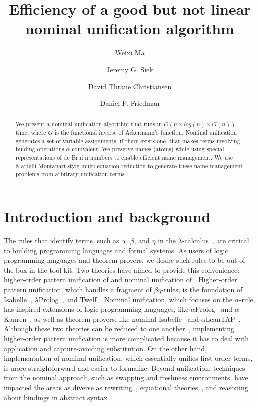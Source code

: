 \documentclass[a4paper,UKenglish]{lipics-v2016}
\title{Efficiency of a good but not linear nominal unification algorithm}
\author[1]{Weixi Ma}
\author[2]{Jeremy G. Siek}
\author[3]{David Thrane Christiansen}
\author[4]{Daniel P. Friedman}
\affil[1]{Indiana University,
  \texttt{mvc@iu.edu}}
\affil[2]{Indiana University,
  \texttt{jsiek@indiana.edu}}
\affil[3]{Galois, Inc.,
  \texttt{dtc@galois.com}}
\affil[4]{Indiana University,
  \texttt{dfried@indiana.edu}}
\begin{document}
\maketitle

\begin{abstract}
  We present a nominal unification algorithm that runs in $O(n \times
  log(n) \times G(n))$ time, where $G$ is the functional inverse of
  Ackermann's function.  Nominal unification generates a set of
  variable assignments, if there exists one, that makes terms
  involving binding operations $\alpha$-equivalent. We preserve names (atoms)
  while using special representations of de Bruijn numbers
  to enable efficient name management.
  We use Martelli-Montanari style multi-equation reduction
  to generate these name management problems from arbitrary unification terms.
\end{abstract}

\section{Introduction and background}

The rules that identify terms, such as $\alpha$, $\beta$, and $\eta$
in the $\lambda$-calculus~\citep{church_calculi_1941}, are critical to
building programming languages and formal systems.  As users of logic
programming languages and theorem provers, we desire such rules to be
out-of-the-box in the tool-kit.  Two theories have aimed to provide
this convenience: higher-order pattern unification of
\citet{miller_logic_1989} and nominal unification of
\citet{urban_nominal_2004}.  Higher-order pattern unification, which
handles a fragment of $\beta\eta$-rules, is the foundation of
Isabelle~\citep{paulson_natural_1986},
$\lambda$Prolog~\citep{nadathur_overview_1988}, and
Twelf~\citep{pfenning_system_1999}.  Nominal unification, which
focuses on the $\alpha$-rule, has inspired extensions of logic
programming languages, like $\alpha$Prolog~\citep{cheney_prolog:_2004}
and $\alpha$Kanren~\citep{byrd_kanren_2007}, as well as theorem
provers, like nominal Isabelle~\citep{urban_nominal_2005} and
$\alpha$LeanTAP~\citep{near_leantap:_2008}.  Although these two
theories can be reduced to one another~\citep{cheney_relating_2005,
  levy_nominal_2012}, implementing higher-order pattern unification is
more complicated because it has to deal with application and
capture-avoiding substitution.  On the other hand, implementation of
nominal unification, which essentially unifies first-order terms, is
more straightforward and easier to formalize.  Beyond unification,
techniques from the nominal approach, such as swapping and freshness
environments, have impacted the areas as diverse as
rewriting~\citep{fernandez_nominal_2004, fernandez_nominal_2005,
  fernandez_nominal_2007, aoto_nominal_2016}, equational
theories~\citep{ayala-rincon_nominal_2016}, and reasoning about
bindings in abstract syntax~\citep{pitts_metalanguage_2000,
  gabbay_new_2002}.
\end{document}
